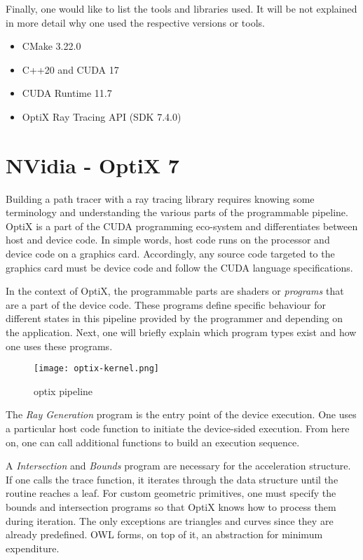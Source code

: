 Finally, one would like to list the tools and libraries used.
It will be not explained in more detail why one used the respective versions or tools.

\begin{itemize}
    \item CMake 3.22.0
    \item C++20 and CUDA 17
    \item CUDA Runtime 11.7
    \item OptiX Ray Tracing API (SDK 7.4.0)
\end{itemize}

\section{NVidia - OptiX 7}

Building a path tracer with a ray tracing library requires knowing some terminology and understanding the various parts of the programmable pipeline.
OptiX is a part of the CUDA programming eco-system and differentiates between host and device code.
In simple words, host code runs on the processor and device code on a graphics card.
Accordingly, any source code targeted to the graphics card must be device code and follow the CUDA language specifications.

In the context of OptiX, the programmable parts are shaders or \textit{programs} that are a part of the device code.
These programs define specific behaviour for different states in this pipeline provided by the programmer and depending on the application.
Next, one will briefly explain which program types exist and how one uses these programs.

\begin{figure}[h]
    \begin{center}
        \texttt{[image: optix-kernel.png]}
    \end{center}
    \caption{optix pipeline \cite{nvidia_nvidia_2022}}
    \label{fig:optix-kernel}
\end{figure}

The \textit{Ray Generation} program is the entry point of the device execution.
One uses a particular host code function to initiate the device-sided execution.
From here on, one can call additional functions to build an execution sequence.

A \textit{Intersection} and \textit{Bounds} program are necessary for the acceleration structure.
If one calls the trace function, it iterates through the data structure until the routine reaches a leaf.
For custom geometric primitives, one must specify the bounds and intersection programs so that OptiX knows how to process them during iteration.
The only exceptions are triangles and curves since they are already predefined.
OWL forms, on top of it, an abstraction for minimum expenditure.

